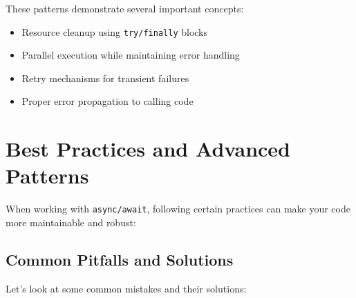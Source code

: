 \documentclass[12pt,letterpaper]{article}
\begin{document}
These patterns demonstrate several important concepts:

\begin{itemize}
    \item Resource cleanup using \texttt{\textcolor{accentColor}{try/finally}} blocks
    \item Parallel execution while maintaining error handling
    \item Retry mechanisms for transient failures
    \item Proper error propagation to calling code
\end{itemize}

\section{Best Practices and Advanced Patterns}

When working with \texttt{\textcolor{accentColor}{async/await}}, following certain practices can make your code more maintainable and robust:

\subsection{Common Pitfalls and Solutions}

Let's look at some common mistakes and their solutions:
\end{document}
